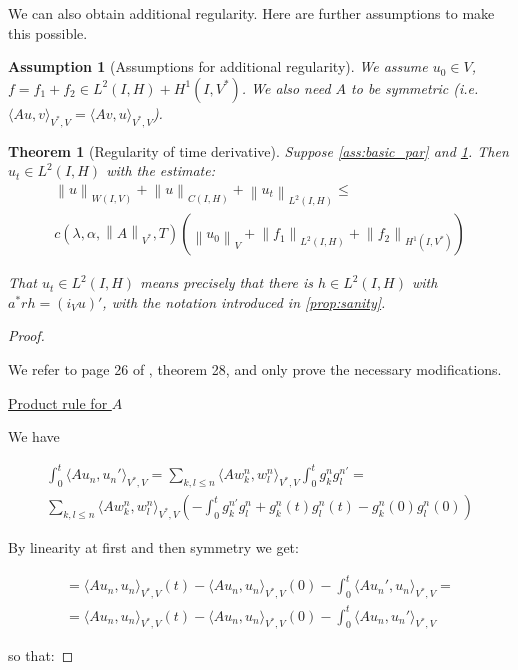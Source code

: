 \documentclass[english,a4paper,9pt,oneside]{scrbook}	%
\theoremstyle{break}
\newtheorem{thm}[equation]{Theorem}
\newtheorem{ass}[equation]{Assumption}
\newenvironment{mproof}[1][\proofname]{%
  \begin{proof}[#1]$ $\par\nobreak\ignorespaces
}{%
  \end{proof}
}
\renewcommand*{\proofname}{Proof}
\theoremstyle{remark}
\newcommand{\norm}[1]{\left\lVert#1\right\rVert}
\newcommand{\VN}[1]{\norm{#1}_{V}}
\newcommand{\VSN}[1]{\norm{#1}_{V^*}}
\begin{document}
\begin{appendices}
We can also obtain additional regularity. Here are further assumptions to make this possible.

\begin{ass}[Assumptions for additional regularity]
\label{ass:reg_par}
We assume $u_0 \in V$, $f = f_1+f_2 \in L^2(I,H)+H^1(I,V^*)$. We also need $A$ to be symmetric (i.e. $\langle Au,v \rangle_{V^*,V} = \langle Av,u \rangle_{V^*,V}$).
\end{ass}

\begin{thm}[Regularity of time derivative]
\label{thm:reg_time}
Suppose \cref{ass:basic_par} and \cref{ass:reg_par}. Then $u_t \in L^2(I, H)$ with the estimate:
\begin{align}
	\norm{u}_{W(I,V)} + \norm{u}_{C(I,H)} + \norm{u_t}_{L^2(I,H)} \leq\\ c(\lambda, \alpha, \VSN{A}, T)(\VN{u_0}+\norm{f_1}_{L^2(I,H)} + \norm{f_2}_{H^1(I,V^*)})
\end{align}

That $u_t \in L^2(I, H)$ means precisely that there is $h \in L^2(I,H)$ with $a^* r h = (i_V u)'$, with the notation introduced in \cref{prop:sanity}.

\end{thm}
\begin{mproof}
We refer to page 26 of \cite{gilardi}, theorem 28, and only prove the necessary modifications.

\underline{Product rule for $A$}

We have 

\begin{align*}
\int_0^t \langle Au_n,u_n' \rangle_{V^*,V} = \sum_{k,l\leq n} \langle Aw^n_k,w^n_l \rangle_{V^*,V} \int_0^t g_k^n g_l^{n '} = \\
\sum_{k,l\leq n} \langle Aw^n_k,w^n_l \rangle_{V^*,V} \left (-\int_0^t g_k^{n'} g_l^n + g_k^n(t) g_l^n(t)-g_k^n(0) g_l^n(0) \right )
\end{align*}

By linearity at first and then symmetry we get:

\begin{align*}
	= \langle Au_n,u_n \rangle_{V^*,V}(t)-\langle Au_n,u_n \rangle_{V^*,V}(0)-\int_0^t\langle Au_n',u_n \rangle_{V^*,V}=\\
	= \langle Au_n,u_n \rangle_{V^*,V}(t)-\langle Au_n,u_n \rangle_{V^*,V}(0)-\int_0^t\langle Au_n,u_n' \rangle_{V^*,V}
\end{align*}

so that:


\end{mproof}
\end{appendices}
\end{document}
